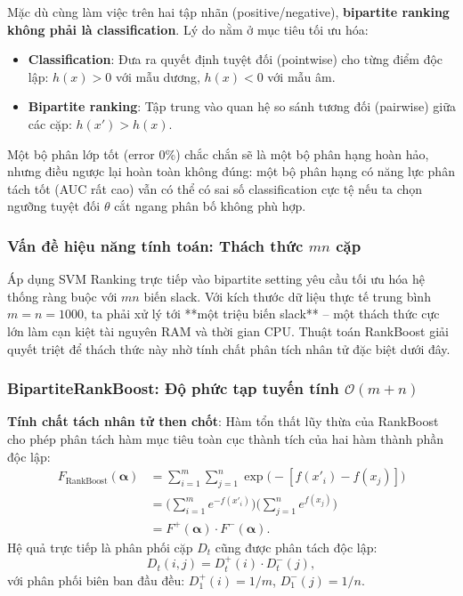 \begin{tcolorbox}[colback=red!5, colframe=red!50!black,
                 title={Khác biệt bản chất với binary classification}]
Mặc dù cùng làm việc trên hai tập nhãn (positive/negative), \textbf{bipartite ranking không phải là classification}. 
Lý do nằm ở mục tiêu tối ưu hóa:
\begin{itemize}
    \item \textbf{Classification}: Đưa ra quyết định tuyệt đối (pointwise) cho từng điểm độc lập: $h(x) > 0$ với mẫu dương, $h(x) < 0$ với mẫu âm.
    \item \textbf{Bipartite ranking}: Tập trung vào quan hệ so sánh tương đối (pairwise) giữa các cặp: $h(x') > h(x)$.
\end{itemize}
Một bộ phân lớp tốt (error 0\%) chắc chắn sẽ là một bộ phân hạng hoàn hảo, nhưng điều ngược lại hoàn toàn không đúng: một bộ phân hạng có năng lực phân tách tốt (AUC rất cao) vẫn có thể có sai số classification cực tệ nếu ta chọn ngưỡng tuyệt đối $\theta$ cắt ngang phân bố không phù hợp.
\end{tcolorbox}

\subsubsection{Vấn đề hiệu năng tính toán: Thách thức $mn$ cặp}

Áp dụng SVM Ranking trực tiếp vào bipartite setting yêu cầu tối ưu hóa hệ thống ràng buộc với $mn$ biến slack. Với kích thước dữ liệu thực tế trung bình $m = n = 1000$, ta phải xử lý tới **một triệu biến slack** -- một thách thức cực lớn làm cạn kiệt tài nguyên RAM và thời gian CPU. Thuật toán RankBoost giải quyết triệt để thách thức này nhờ tính chất phân tích nhân tử đặc biệt dưới đây.

\subsubsection{BipartiteRankBoost: Độ phức tạp tuyến tính $\mathcal{O}(m+n)$}

\textbf{Tính chất tách nhân tử then chốt}: Hàm tổn thất lũy thừa của RankBoost cho phép phân tách hàm mục tiêu toàn cục thành tích của hai hàm thành phần độc lập:
\begin{align}
    F_{\text{RankBoost}}(\bm{\alpha})
    &= \sum_{i=1}^m \sum_{j=1}^n \exp\bigl(-[f(x'_i) - f(x_j)]\bigr) \nonumber \\
    &= \biggl(\sum_{i=1}^m e^{-f(x'_i)}\biggr) \biggl(\sum_{j=1}^n e^{f(x_j)}\biggr) \nonumber \\
    &= F^+(\bm{\alpha}) \cdot F^-(\bm{\alpha}).
    \label{eq:F_factor}
\end{align}
Hệ quả trực tiếp là phân phối cặp $D_t$ cũng được phân tách độc lập:
\[
    D_t(i, j) = D^+_t(i) \cdot D^-_t(j),
\]
với phân phối biên ban đầu đều: $D^+_1(i) = 1/m$, $D^-_1(j) = 1/n$.

